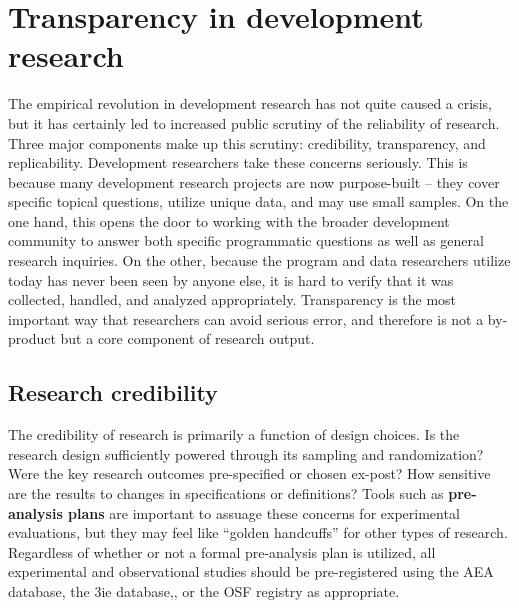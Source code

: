 
\section{Transparency in development research}

The empirical revolution in development research has not quite caused a crisis,
but it has certainly led to increased public scrutiny of the reliability of research.\cite{rogers_2017}
Three major components make up this scrutiny: credibility,\cite{ioannidis2017power} transparency,\cite{christensen2018transparency} and replicability.\cite{duvendack2017meant}
Development researchers take these concerns seriously.
This is because many development research projects are now purpose-built --
they cover specific topical questions, utilize unique data, and may use small samples.
On the one hand, this opens the door to working with the broader development community
to answer both specific programmatic questions as well as general research inquiries.
On the other, because the program and data researchers utilize today has never been seen by anyone else,
it is hard to verify that it was collected, handled, and analyzed appropriately.
Transparency is the most important way that researchers can avoid serious error,
and therefore is not a by-product but a core component of research output.

\subsection{Research credibility}

The credibility of research is primarily a function of design choices.\cite{ioannidis2005most}
Is the research design sufficiently powered through its sampling and randomization?
Were the key research outcomes pre-specified or chosen ex-post?
How sensitive are the results to changes in specifications or definitions?
Tools such as \textbf{pre-analysis plans} are important to assuage these concerns for experimental evaluations,
but they may feel like ``golden handcuffs'' for other types of research.\cite{olken2015promises}
Regardless of whether or not a formal pre-analysis plan is utilized,
all experimental and observational studies should be pre-registered
using the AEA database, 
the 3ie database,,
or the OSF registry as appropriate.

